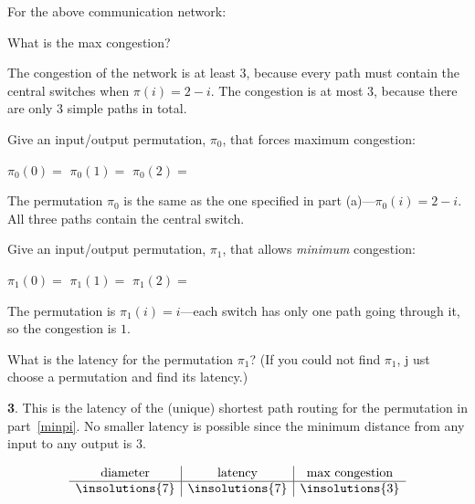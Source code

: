\begin{problem}[4] For the above communication network:

\bparts

\ppart[1] What is the max congestion? \hfill \examrule{0.5in}

\begin{solution}
The congestion of the network is at least 3,
  because every path must contain the central switches when $\pi(i) = 2 -
  i$.  The congestion is at most 3, because there are only 3 simple paths
  in total.
\end{solution}

\ppart[1] Give an input/output permutation, $\pi_0$, that forces maximum
  congestion:

\hfill $\pi_0(0) =$ \brule{0.4in}  \qquad $\pi_0(1) =$ \brule{0.4in}
\qquad $\pi_0(2) =$ \brule{0.4in}

\begin{solution}
The permutation $\pi_0$ is the same as the one specified in
  part (a)---$\pi_0(i) = 2-i$.  All three paths contain the central
  switch. 
\end{solution}

\ppart[1]\label{minpi} Give an input/output permutation, $\pi_1$, that
allows \emph{minimum} congestion:

\hfill $\pi_1(0) =$ \brule{0.4in}  \qquad $\pi_1(1) =$ \brule{0.4in}
\qquad $\pi_1(2) =$ \brule{0.4in}

\begin{solution}
The permutation is $\pi_1(i) = i$---each switch has only
one path going through it, so the congestion is $1$.
\end{solution}


\ppart[1] What is the latency for the permutation $\pi_1$? (If you could not find $\pi_1$, j
ust choose a permutation and find its latency.)
\hfill\examrule{0.5in}

\begin{solution}
\textbf{3}.  This is the latency of
  the (unique) shortest path routing for the permutation in
  part~\eqref{minpi}.  No smaller latency is possible since the minimum
  distance from any input to any output is 3.
\end{solution}
\eparts



{\large
\[
\begin{array}{c|c|c}
\text{diameter} &
\text{latency} &
\text{max congestion} \\ \hline
\insolutions{7} &
\insolutions{7} &
\insolutions{3}
\end{array}
\]
}




\end{problem}
